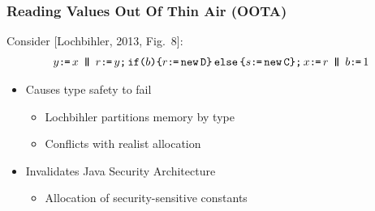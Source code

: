 \documentclass[t,aspectratio=169]{beamer} %
\begin{document}
\begin{frame}
  \frametitle{Reading Values Out Of Thin Air (OOTA)}
  Consider [Lochbihler, 2013, Fig.~8]:
  \begin{gather*}
    y\GETS x
    \PAR
    \aReg\GETS y \SEMI \IF{b} \THEN \aReg \GETS \NEW \classD \ELSE \bReg \GETS \NEW \classC \FI  \SEMI x \GETS \aReg 
    \PAR %
    b \GETS 1
  \end{gather*}
  \begin{itemize}
  \item<2-> Causes type safety to fail
    \begin{itemize}
    \item{} Lochbihler partitions memory by type
    \item{} Conflicts with realist allocation
    \end{itemize}
  \item<3-> Invalidates Java Security Architecture
    \begin{itemize}
    \item{} Allocation of security-sensitive constants
    \end{itemize}
  \end{itemize}  
\end{frame}
\end{document}
